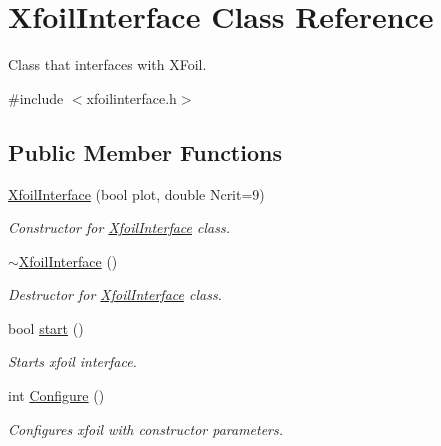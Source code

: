 \hypertarget{classXfoilInterface}{}\section{Xfoil\+Interface Class Reference}
\label{classXfoilInterface}


Class that interfaces with X\+Foil.  




{\ttfamily \#include $<$xfoilinterface.\+h$>$}

\subsection*{Public Member Functions}
\begin{DoxyCompactItemize}
\item 
\mbox{\label{classXfoilInterface_acf3d487c09b576a8730a23eb6decee57}} 
\hyperlink{classXfoilInterface_acf3d487c09b576a8730a23eb6decee57}{Xfoil\+Interface} (bool plot, double Ncrit=9)
\begin{DoxyCompactList}\small\item\em Constructor for \hyperlink{classXfoilInterface}{Xfoil\+Interface} class. \end{DoxyCompactList}\item 
\mbox{\label{classXfoilInterface_a48dc2121cd7710c73eee89643088ab7c}} 
\hyperlink{classXfoilInterface_a48dc2121cd7710c73eee89643088ab7c}{$\sim$\+Xfoil\+Interface} ()
\begin{DoxyCompactList}\small\item\em Destructor for \hyperlink{classXfoilInterface}{Xfoil\+Interface} class. \end{DoxyCompactList}\item 
bool \hyperlink{classXfoilInterface_aba502bd5accaf23d3bdf342a82d5fb7f}{start} ()
\begin{DoxyCompactList}\small\item\em Starts xfoil interface. \end{DoxyCompactList}\item 
\mbox{\label{classXfoilInterface_aedc0b9716eb07c623b9577c69ad2cc97}} 
int \hyperlink{classXfoilInterface_aedc0b9716eb07c623b9577c69ad2cc97}{Configure} ()
\begin{DoxyCompactList}\small\item\em Configures xfoil with constructor parameters. \end{DoxyCompactList}\item 

\end{DoxyCompactItemize}

